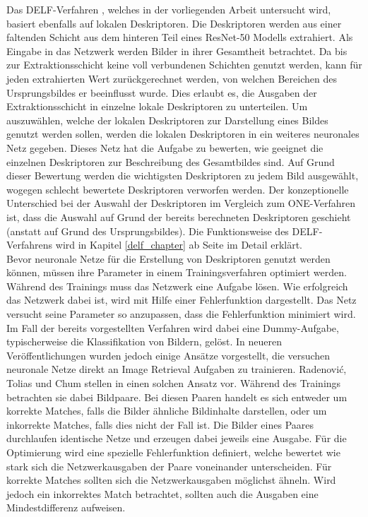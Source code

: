 Das DELF-Verfahren \cite{delf}, welches in der vorliegenden Arbeit untersucht wird, basiert ebenfalls auf lokalen Deskriptoren. Die Deskriptoren werden aus einer faltenden Schicht aus dem hinteren Teil eines ResNet-50 \cite{resnet} Modells extrahiert. Als Eingabe in das Netzwerk werden Bilder in ihrer Gesamtheit betrachtet. Da bis zur Extraktionsschicht keine voll verbundenen Schichten genutzt werden, kann für jeden extrahierten Wert zurückgerechnet werden, von welchen Bereichen des Ursprungsbildes er beeinflusst wurde. Dies erlaubt es, die Ausgaben der Extraktionsschicht in einzelne lokale Deskriptoren zu unterteilen. Um auszuwählen, welche der lokalen Deskriptoren zur Darstellung eines Bildes genutzt werden sollen, werden die lokalen Deskriptoren in ein weiteres neuronales Netz gegeben. Dieses Netz hat die Aufgabe zu bewerten, wie geeignet die einzelnen Deskriptoren zur Beschreibung des Gesamtbildes sind. Auf Grund dieser Bewertung werden die wichtigsten Deskriptoren zu jedem Bild ausgewählt, wogegen schlecht bewertete Deskriptoren verworfen werden. Der konzeptionelle Unterschied bei der Auswahl der Deskriptoren im Vergleich zum ONE-Verfahren ist, dass die Auswahl auf Grund der bereits berechneten Deskriptoren geschieht (anstatt auf Grund des Ursprungsbildes). Die Funktionsweise des DELF-Verfahrens wird in Kapitel \ref{delf_chapter} ab Seite \pageref{delf_chapter} im Detail erklärt.
\\  
Bevor neuronale Netze für die Erstellung von Deskriptoren genutzt werden können, müssen ihre Parameter in einem Trainingsverfahren optimiert werden. Während des Trainings muss das Netzwerk eine Aufgabe lösen. Wie erfolgreich das Netzwerk dabei ist, wird mit Hilfe einer Fehlerfunktion dargestellt. Das Netz versucht seine Parameter so anzupassen, dass die Fehlerfunktion minimiert wird. Im Fall der bereits vorgestellten Verfahren wird dabei eine Dummy-Aufgabe, typischerweise die Klassifikation von Bildern, gelöst. In neueren Veröffentlichungen wurden jedoch einige Ansätze vorgestellt, die versuchen neuronale Netze direkt an Image Retrieval Aufgaben zu trainieren. Radenović, Tolias und Chum stellen in \cite{siamac_contrastive_loss} einen solchen Ansatz vor. Während des Trainings betrachten sie dabei Bildpaare. Bei diesen Paaren handelt es sich entweder um korrekte Matches, falls die Bilder ähnliche Bildinhalte darstellen, oder um inkorrekte Matches, falls dies nicht der Fall ist. Die Bilder eines Paares durchlaufen identische Netze und erzeugen dabei jeweils eine Ausgabe. Für die Optimierung wird eine spezielle Fehlerfunktion definiert, welche bewertet wie stark sich die Netzwerkausgaben der Paare voneinander unterscheiden. Für korrekte Matches sollten sich die Netzwerkausgaben möglichst ähneln. Wird jedoch ein inkorrektes Match betrachtet, sollten auch die Ausgaben eine Mindestdifferenz aufweisen.

